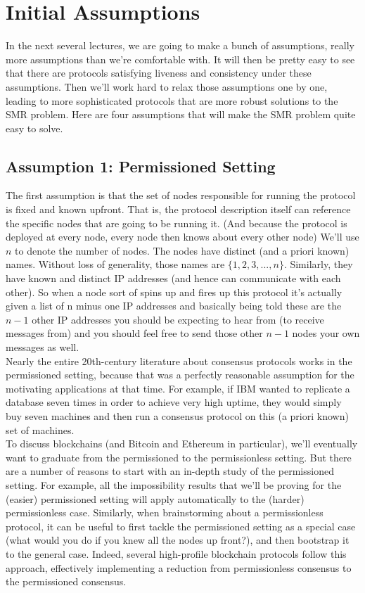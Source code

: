 \section{Initial Assumptions}
In the next several lectures, we are going to make a bunch of assumptions, really more assumptions than we’re
comfortable with. It will then be pretty easy to see that there are protocols satisfying liveness
and consistency under these assumptions. Then we’ll work hard to relax those assumptions
one by one, leading to more sophisticated protocols that are more robust solutions to the
SMR problem. Here are four assumptions that will make the SMR problem quite easy to
solve.

\subsection{Assumption 1: Permissioned Setting}
The first assumption is that the set of nodes responsible for running the protocol is fixed
and known upfront. That is, the protocol description itself can reference the specific nodes
that are going to be running it. (And because the protocol is deployed at every node, every
node then knows about every other node) We’ll use $n$ to denote the number of nodes. The
nodes have distinct (and a priori known) names. Without loss of generality, those names
are $\{1, 2, 3, . . . , n\}$. Similarly, they have known and distinct IP addresses (and hence can
communicate with each other). So when a node sort of
spins up and fires up this protocol it's
actually given a list of n minus one IP
addresses and basically being told these are the $n-1$ other IP addresses you should
be expecting to hear from (to receive
messages from) and you should feel
free to send those other $n-1$
nodes your own messages as well.\\
Nearly the entire 20th-century literature about consensus protocols works in the permissioned setting, because that was a perfectly reasonable assumption for the motivating
applications at that time. For example, if IBM wanted to replicate a database seven times
in order to achieve very high uptime, they would simply buy seven machines and then run
a consensus protocol on this (a priori known) set of machines.\\
To discuss blockchains (and Bitcoin and Ethereum in particular), we’ll eventually want
to graduate from the permissioned to the permissionless setting. But there are a number of
reasons to start with an in-depth study of the permissioned setting. For example, all the
impossibility results that we’ll be proving for the (easier) permissioned setting will apply
automatically to the (harder) permissionless case. Similarly, when brainstorming about a
permissionless protocol, it can be useful to first tackle the permissioned setting as a special case (what would you do if you knew all the nodes up front?), and then bootstrap it
to the general case. Indeed, several high-profile blockchain protocols follow this approach,
effectively implementing a reduction from permissionless consensus to the permissioned consensus.

